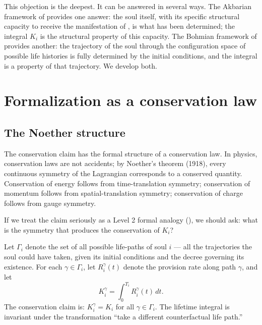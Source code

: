 This objection is the deepest. It can be answered in several ways.
The Akbarian framework of  provides one answer:
the soul itself, with its specific structural capacity to receive
the manifestation of , is what has been determined;
the integral $K_i$ is the structural property of this capacity. The
Bohmian framework of  provides another:
the trajectory of the soul through the configuration space of
possible life histories is fully determined by the initial
conditions, and the integral is a property of that trajectory. We
develop both.

\section{Formalization as a conservation law}
\label{sec:rizq-formalization}

\subsection{The Noether structure}

The conservation claim has the formal structure of a conservation
law. In physics, conservation laws are not accidents; by Noether's
theorem (1918), every continuous symmetry of the Lagrangian
corresponds to a conserved quantity. Conservation of energy follows
from time-translation symmetry; conservation of momentum follows
from spatial-translation symmetry; conservation of charge follows
from gauge symmetry.

If we treat the claim seriously as a Level 2 formal analogy
(), we should ask: what is the symmetry
that produces the conservation of $K_i$?

\begin{conceptbox}
\label{conc:counterfactual-invariance}
Let $\Gamma_i$ denote the set of all possible life-paths of soul
$i$ --- all the trajectories the soul could have taken, given its
initial conditions and the decree governing its existence. For each
$\gamma \in \Gamma_i$, let $R_i^\gamma(t)$ denote the provision rate
along path $\gamma$, and let
\[
    K_i^\gamma = \int_0^{T_i} R_i^\gamma(t)\, dt.
\]
The conservation claim is: $K_i^\gamma = K_i$ for all $\gamma \in
\Gamma_i$. The lifetime integral is invariant under the
transformation ``take a different counterfactual life path.''
\end{conceptbox}

